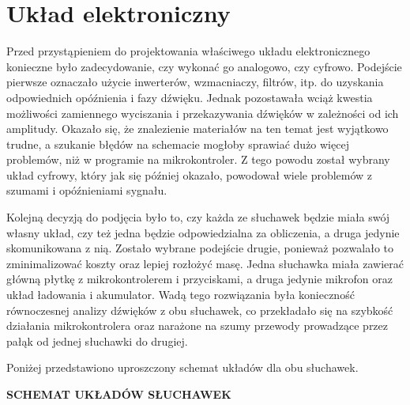 \section{Układ elektroniczny}

Przed przystąpieniem do projektowania właściwego układu elektronicznego konieczne było zadecydowanie, czy wykonać go analogowo, czy cyfrowo. Podejście pierwsze oznaczało użycie inwerterów, wzmacniaczy, filtrów, itp. do uzyskania odpowiednich opóźnienia i fazy dźwięku. Jednak pozostawała wciąż kwestia możliwości zamiennego wyciszania i przekazywania dźwięków w zależności od ich amplitudy. Okazało się, że znalezienie materiałów na ten temat jest wyjątkowo trudne, a szukanie błędów na schemacie mogłoby sprawiać dużo więcej problemów, niż w programie na mikrokontroler. Z tego powodu został wybrany układ cyfrowy, który jak się później okazało, powodował wiele problemów z szumami i opóźnieniami sygnału.

Kolejną decyzją do podjęcia było to, czy każda ze słuchawek będzie miała swój własny układ, czy też jedna będzie odpowiedzialna za obliczenia, a druga jedynie skomunikowana z nią. Zostało wybrane podejście drugie, ponieważ pozwalało to zminimalizować koszty oraz lepiej rozłożyć masę. Jedna słuchawka miała zawierać główną płytkę z mikrokontrolerem i przyciskami, a druga jedynie mikrofon oraz układ ładowania i akumulator. Wadą tego rozwiązania była konieczność równoczesnej analizy dźwięków z obu słuchawek, co przekładało się na szybkość działania mikrokontrolera oraz narażone na szumy przewody prowadzące przez pałąk od jednej słuchawki do drugiej.

Poniżej przedstawiono uproszczony schemat układów dla obu słuchawek.

\textbf{SCHEMAT UKŁADÓW SŁUCHAWEK}

